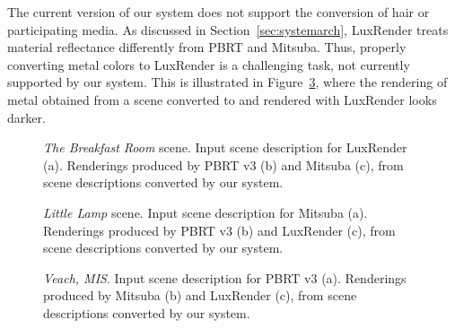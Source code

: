 The current version of our system does not support the conversion of hair or participating media. 
%
As discussed in Section~\ref{sec:systemarch}, LuxRender treats material reflectance differently from PBRT and Mitsuba. Thus, properly converting metal colors to LuxRender is a challenging task, not currently supported by our system. This is illustrated in Figure~\ref{fig:MIS}, where the rendering of metal obtained from a scene converted to and rendered with LuxRender looks darker.  

\begin{figure}
\centering
{}	
\caption{\textit{The Breakfast Room} scene. Input scene description for LuxRender (a).
	Renderings produced by PBRT v3 (b) and Mitsuba (c),
	from scene descriptions converted by our system. }
\label{fig:dining-room}
\end{figure}

\begin{figure}
	\centering
	\caption{\textit{Little Lamp} scene. Input scene description for Mitsuba (a).
		Renderings produced by PBRT v3 (b) and LuxRender (c),
		from scene descriptions converted by our system. }
	\label{fig:lamp}
\end{figure}

\begin{figure}
	\centering
	\caption{\textit{Veach, MIS}. Input scene description for PBRT v3 (a).
		Renderings produced by Mitsuba (b) and LuxRender (c),
		from scene descriptions converted by our system. } 
	\label{fig:MIS}
\end{figure}

